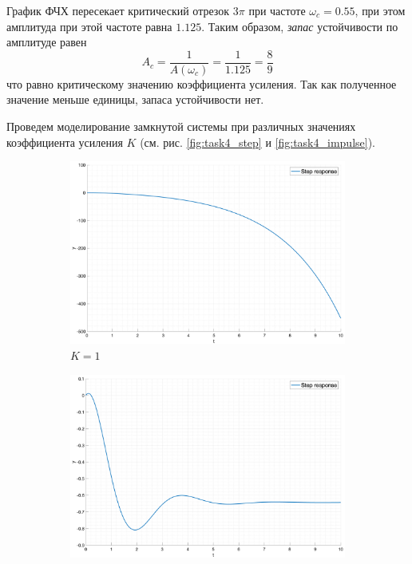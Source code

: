 График ФЧХ пересекает критический отрезок $3\pi$ при частоте $\omega_c  = 0.55$, при этом 
амплитуда при этой частоте равна $1.125$. Таким образом, \textit{запас} устойчивости по амплитуде равен 
\begin{equation}
    A_c = \frac{1}{A(\omega_c)} = \frac{1}{1.125} = \frac{8}{9}
\end{equation}
что равно критическому значению коэффициента усиления. Так как полученное значение меньше 
единицы, запаса устойчивости нет. 

Проведем моделирование замкнутой системы при различных значениях коэффициента усиления $K$ (см. рис. \ref{fig:task4_step} и \ref{fig:task4_impulse}).
\begin{figure}[ht!]
    \begin{subfigure}{0.5\textwidth}
        \centering
        \includegraphics[width=\textwidth]{media/plots/task4_step_response_closed_1.png}
        \caption{$K = 1$}
    \end{subfigure}%
    \begin{subfigure}{0.5\textwidth}
        \centering
        \includegraphics[width=\textwidth]{media/plots/task4_step_response_closed_2.png}

\end{subfigure}
\end{figure}

